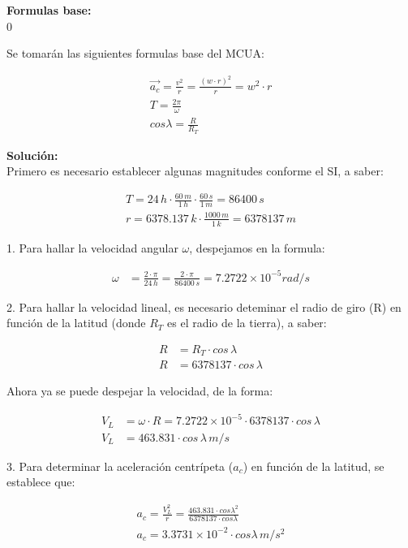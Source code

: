 \documentclass[11pt,letterpaper]{article}
\begin{document}
\textbf{Formulas base:}\\0

Se tomarán las siguientes formulas base del MCUA:

\begin{align}
\boxed{ \vec{a_{c}} = \frac{v^2}{r} = \frac{(w \cdot r)^2}{r} = w^2 \cdot r}\\
\boxed{ T = \frac{2\pi}{\omega}}\\
\boxed{ cos \lambda = \frac{R}{R_{T}}}
\end{align}

\textbf{Solución:}\\

Primero es necesario establecer algunas magnitudes conforme el SI, a saber:

\begin{align*}
T = 24\,h \cdot \frac{60\,m}{1\,h} \cdot \frac{60\,s}{1\,m} = 86400\,s\\
r = 6378.137\,k \cdot \frac{1000\,m}{1\,k} = 6378137\,m
\end{align*}

1. Para hallar la velocidad angular $\omega$, despejamos en la formula:

\begin{align}
\omega &= \frac{2 \cdot \pi}{24\,h} =  \frac{2 \cdot \pi}{86400\,s}  = 7.2722 \times 10^{-5} rad/s
\end{align}

2. Para hallar la velocidad lineal, es necesario deteminar el radio de giro (R) en función de la latitud (donde $R_{T}$ es el radio de la tierra), a saber:

\begin{align}
R &= R_{T} \cdot cos\,\lambda\\
R &= 6378137 \cdot cos\,\lambda
\end{align}

Ahora ya se puede despejar la velocidad, de la forma:

\begin{align}
V_{L} &= \omega \cdot R = 7.2722 \times 10^{-5} \cdot 6378137 \cdot cos\,\lambda\\ 
V_{L} &= 463.831\cdot cos\,\lambda\,m/s
\end{align}

3. Para determinar la aceleración centrípeta ($a_{c}$) en función de la latitud, se establece que:

\begin{align}
a_{c} = \frac{V_{L}^2}{r} = \frac{463.831 \cdot cos \lambda^2}{6378137 \cdot cos \lambda}\\
a_{c} = 3.3731 \times 10^{-2} \cdot cos \lambda\,m/s^2
\end{align}
\end{document}
